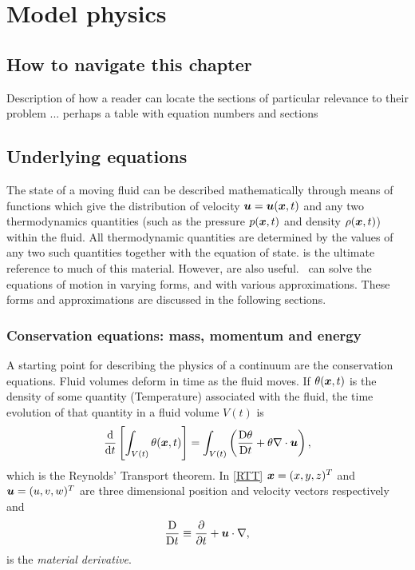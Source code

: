 \chapter{Model physics}\label{chap:model_physics}

\section{How to navigate this chapter}
Description of how a reader can locate the sections of particular relevance to their problem ...
perhaps a table with equation numbers and sections

\section{Underlying equations}\label{Sect:Eqns}

The state of a moving fluid can be described mathematically through means of
functions which give the distribution of velocity ${\mbox{\boldmath$u$}}={\mbox{\boldmath$u$}}({\mbox{\boldmath$x$}},t)$ and
any two thermodynamics quantities (such as the pressure $p({\mbox{\boldmath$x$}},t)$ and
density $\rho({\mbox{\boldmath$x$}},t)$) within the fluid. All thermodynamic quantities are
determined by the values of any two such quantities together with the
equation of state. \citet{batchelor1967} is the ultimate reference to much of this
material. However, \cite{landau,cushman1994,panton2006,vallis2006,gill1982} are also
useful. \fluidity\ can solve the equations of motion in varying forms, and
with various approximations. These forms and approximations are discussed in
the following sections.

\subsection{Conservation equations: mass, momentum and energy}
A starting point for describing the physics of a continuum are the conservation equations. Fluid volumes deform in time as the fluid moves. If $\theta({\mbox{\boldmath$x$}},t)$ is the density of some quantity (\eg Temperature) associated with the fluid, the time evolution of that quantity in a fluid volume $V(t)$ is 
\begin{equation}\label{RTT}
 \frac{\mathrm{d}}{\mathrm{d} t}\left[\int_{V(t)}\theta({\mbox{\boldmath$x$}},t)\right]=
 \int_{V(t)}\left(\frac{\mathrm{D}\theta}{\mathrm{D} t}+\theta\nabla\cdot{\mbox{\boldmath$u$}}\right),
\end{equation}
which is the Reynolds' Transport theorem. In \eqref{RTT} ${\mbox{\boldmath$x$}}=(x,y,z)^T$ and ${\mbox{\boldmath$u$}}=(u,v,w)^T$ are three dimensional position and velocity vectors respectively and 
\begin{equation}\label{MatDiv}
 \frac{\mathrm{D}}{\mathrm{D} t}\equiv\frac{\partial}{\partial{t}}+{\mbox{\boldmath$u$}}\cdot\nabla,
\end{equation}
is the \textit{material derivative}.
